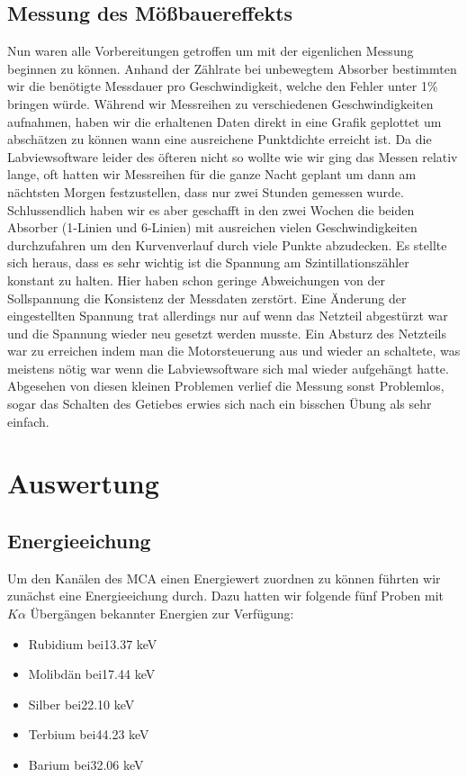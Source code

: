 \documentclass[12pt]{article}
\begin{document}
\subsection{Messung des Mößbauereffekts}
Nun waren alle Vorbereitungen getroffen um mit der eigenlichen Messung beginnen zu können. Anhand der Zählrate bei unbewegtem Absorber bestimmten wir die benötigte Messdauer pro Geschwindigkeit,
welche den Fehler unter 1\% bringen würde. Während wir Messreihen zu verschiedenen Geschwindigkeiten aufnahmen, haben wir die erhaltenen Daten direkt in eine Grafik geplottet um abschätzen
zu können wann eine ausreichene Punktdichte erreicht ist. Da die Labviewsoftware leider des öfteren nicht so wollte wie wir ging das Messen relativ lange, oft hatten wir Messreihen für die ganze
Nacht geplant um dann am nächtsten Morgen festzustellen, dass nur zwei Stunden gemessen wurde. Schlussendlich haben wir es aber geschafft in den zwei Wochen die beiden Absorber (1-Linien und 6-Linien)
mit ausreichen vielen Geschwindigkeiten durchzufahren um den Kurvenverlauf durch viele Punkte abzudecken. Es stellte sich heraus, dass es sehr wichtig ist die Spannung am Szintillationszähler konstant
zu halten. Hier haben schon geringe Abweichungen von der Sollspannung die Konsistenz der Messdaten zerstört. Eine Änderung der eingestellten Spannung trat allerdings nur auf wenn das Netzteil
abgestürzt war und die Spannung wieder neu gesetzt werden musste. Ein Absturz des Netzteils war zu erreichen indem man die Motorsteuerung aus und wieder an schaltete, was meistens nötig war
wenn die Labviewsoftware sich mal wieder aufgehängt hatte. Abgesehen von diesen kleinen Problemen verlief die Messung sonst Problemlos, sogar das Schalten des Getiebes erwies sich nach ein bisschen
Übung als sehr einfach.
\section{Auswertung}
\subsection{Energieeichung}

Um den Kanälen des MCA einen Energiewert zuordnen zu können führten wir zunächst eine Energieeichung durch. Dazu hatten wir folgende fünf Proben mit $K\alpha$ Übergängen
bekannter Energien zur Verfügung:
\begin{itemize}
 \item Rubidium bei\hspace{30pt}13.37 keV
 \item Molibdän bei\hspace{30pt}17.44 keV
 \item Silber	bei\hspace{30pt}22.10 keV
 \item Terbium  bei\hspace{30pt}44.23 keV
 \item Barium   bei\hspace{30pt}32.06 keV
\end{itemize}
\end{document}
